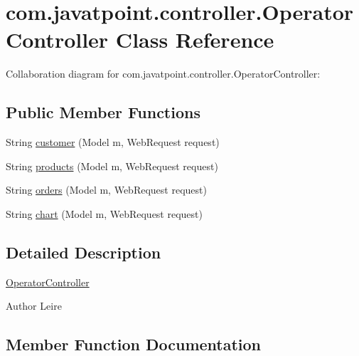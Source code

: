 \hypertarget{classcom_1_1javatpoint_1_1controller_1_1_operator_controller}{}\section{com.\+javatpoint.\+controller.\+Operator\+Controller Class Reference}
\label{classcom_1_1javatpoint_1_1controller_1_1_operator_controller}


Collaboration diagram for com.\+javatpoint.\+controller.\+Operator\+Controller\+:
\subsection*{Public Member Functions}
\begin{DoxyCompactItemize}
\item 
String \mbox{\hyperlink{classcom_1_1javatpoint_1_1controller_1_1_operator_controller_ae72c04d6241d916e7ebcfce5ba4d5390}{customer}} (Model m, Web\+Request request)
\item 
String \mbox{\hyperlink{classcom_1_1javatpoint_1_1controller_1_1_operator_controller_acd0e1143c0636d600fa748930b2ed18a}{products}} (Model m, Web\+Request request)
\item 
String \mbox{\hyperlink{classcom_1_1javatpoint_1_1controller_1_1_operator_controller_aa55117789c24f6dd8cbebf27c6e886ea}{orders}} (Model m, Web\+Request request)
\item 
String \mbox{\hyperlink{classcom_1_1javatpoint_1_1controller_1_1_operator_controller_a95b8c530cd635d9eab5b982cc9f5f70b}{chart}} (Model m, Web\+Request request)
\end{DoxyCompactItemize}


\subsection{Detailed Description}
\mbox{\hyperlink{classcom_1_1javatpoint_1_1controller_1_1_operator_controller}{Operator\+Controller}} \begin{DoxyAuthor}{Author}
Leire 
\end{DoxyAuthor}


\subsection{Member Function Documentation}
\mbox{\label{classcom_1_1javatpoint_1_1controller_1_1_operator_controller_a95b8c530cd635d9eab5b982cc9f5f70b}} 
